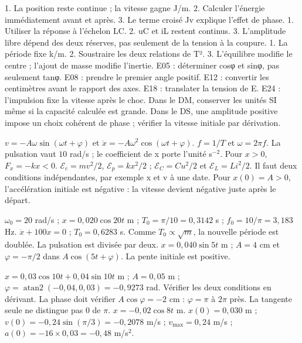 1. La position reste continue ; la vitesse gagne J/m. 2. Calculer l’énergie immédiatement avant et après. 3. Le terme croisé Jv explique l’effet de phase.
1. Utiliser la réponse à l’échelon LC. 2. uC et iL restent continus. 3. L’amplitude libre dépend des deux réserves, pas seulement de la tension à la coupure.
1. La période fixe k/m. 2. Soustraire les deux relations de T². 3. L’équilibre modifie le centre ; l’ajout de masse modifie l’inertie.
E05 : déterminer cosφ et sinφ, pas seulement tanφ. E08 : prendre le premier angle positif. E12 : convertir les centimètres avant le rapport des axes. E18 : translater la tension de E. E24 : l’impulsion fixe la vitesse après le choc.
Dans le DM, conserver les unités SI même si la capacité calculée est grande. Dans le DS, une amplitude positive impose un choix cohérent de phase ; vérifier la vitesse initiale par dérivation.


$v=-A\omega\sin(\omega t+\varphi)$ et $\ddot x=-A\omega^2\cos(\omega t+\varphi)$. $f=1/T$ et $\omega=2\pi f$. La pulsation vaut $10$ rad/s ; le coefficient de x porte l’unité s$^{-2}$.
Pour $x>0$, $F_x=-kx<0$. $\mathcal E_c=mv^2/2$, $\mathcal E_p=kx^2/2$ ; $\mathcal E_C=Cu^2/2$ et $\mathcal E_L=Li^2/2$.
Il faut deux conditions indépendantes, par exemple x et v à une date. Pour $x(0)=A>0$, l’accélération initiale est négative : la vitesse devient négative juste après le départ.


$\omega_0=20$ rad/s ; $x=0{,}020\cos20t$ m ; $T_0=\pi/10=0{,}3142$ s ; $f_0=10/\pi=3{,}183$ Hz.
$\ddot x+100x=0$ ; $T_0=0{,}6283$ s. Comme $T_0\propto\sqrt m$, la nouvelle période est doublée. La pulsation est divisée par deux.
$x=0{,}040\sin5t$ m ; $A=4$ cm et $\varphi=-\pi/2$ dans $A\cos(5t+\varphi)$. La pente initiale est positive.


$x=0{,}03\cos10t+0{,}04\sin10t$ m ; $A=0{,}05$ m ; $\varphi=\operatorname{atan2}(-0{,}04,0{,}03)=-0{,}9273$ rad. Vérifier les deux conditions en dérivant.
La phase doit vérifier $A\cos\varphi=-2$ cm : $\varphi=\pi$ à $2\pi$ près. La tangente seule ne distingue pas 0 de $\pi$. $x=-0{,}02\cos8t$ m.
$x(0)=0{,}030$ m ; $v(0)=-0{,}24\sin(\pi/3)=-0{,}2078$ m/s ; $v_{\max}=0{,}24$ m/s ; $a(0)=-16\times0{,}03=-0{,}48$ m/s$^2$.


